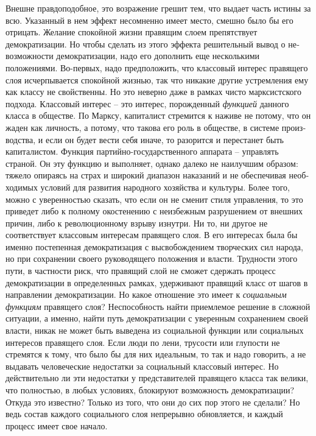 \documentclass{book}
\begin{document}
Внешне правдоподобное, это возражение грешит тем, что вы­дает часть истины за всю. Указанный в нем эффект несомнен­но имеет место, смешно было бы его отрицать. Желание спо­койной жизни правящим слоем препятствует демократизации. Но чтобы сделать из этого эффекта решительный вывод о не­возможности демократизации, надо его дополнить еще несколь­кими положениями. Во-первых, надо предположить, что клас­совый интерес правящего слоя исчерпывается спокойной жиз­нью, так что никакие другие устремления ему как классу не свойственны. Но это неверно даже в рамках чисто марксистско­го подхода. Классовый интерес -- это интерес, порожденный \textit{функцией}  данного класса в обществе. По Марксу, капиталист стремится к наживе не потому, что он жаден как личность, а потому, что такова его роль в обществе, в системе произ­водства, и если он будет вести себя иначе, то разорится и пере­станет быть капиталистом. Функция партийно-государственно­го аппарата -- управлять страной. Он эту функцию и выполняет, однако далеко не наилучшим 
образом: тяжело опираясь на страх и широкий диапазон наказаний и не обеспечивая необ­ходимых условий для развития народного хозяйства и куль­туры. Более того, можно с уверенностью сказать, что если он не сменит стиля управления, то это приведет либо к полному окостенению с неизбежным разрушением от внешних причин, либо к революционному взрыву изнутри. Ни то, ни другое не соответствует классовым интересам правящего слоя. В его интересах была бы именно постепенная демократизация с вы­свобождением творческих сил народа, но при сохранении свое­го руководящего положения и власти. Трудности этого пути, в частности риск, что правящий слой не сможет сдержать про­цесс демократизации в определенных рамках, удерживают пра­вящий класс от шагов в направлении демократизации. Но какое отношение это имеет к \textit{социальным функциям}  правящего слоя? Неспособность найти приемлемое решение в сложной ситуации, а именно, найти путь демократизации с уверенным сохранением своей власти, никак не может быть выведена из со­циальной 
функции или социальных интересов правящего слоя. Если люди по лени, трусости или глупости не стремятся к тому, что было бы для них идеальным, то так и надо говорить, а не выдавать человеческие недостатки за социальный классовый интерес. Но действительно ли эти недостатки у представите­лей правящего класса так велики, что полностью, в любых условиях, блокируют возможность демократизации? Откуда это известно? Только из того, что они до сих пор этого не сде­лали? Но ведь состав каждого социального слоя непрерывно обновляется, и каждый процесс имеет свое начало.
\end{document}
